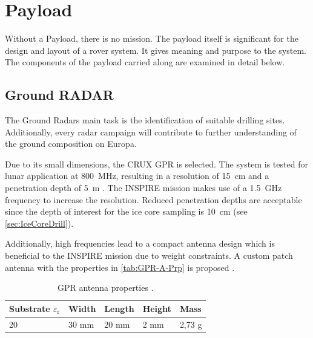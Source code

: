 
\chapter{Payload}
\label{chap:payload}

Without a Payload, there is no mission. The payload itself is significant for the design and layout of a rover system. It gives meaning and purpose to the system. The components of the payload carried along are examined in detail below. 

\section{Ground RADAR}
The Ground Radars main task is the identification of suitable drilling sites. Additionally, every radar campaign will contribute to further understanding of the ground composition on Europa.

Due to its small dimensions, the CRUX GPR is selected. The system is tested for lunar application at 800~MHz, resulting in a resolution of 15~cm and a penetration depth of 5~m \cite{CRUX_GPR}. The INSPIRE mission makes use of a 1.5~GHz frequency to increase the resolution. 
Reduced penetration depths are acceptable since the depth of interest for the ice core sampling is 10~cm (see \autoref{sec:IceCoreDrill}).

Additionally, high frequencies lead to a compact antenna design which is beneficial to the INSPIRE mission due to weight constraints. 
A custom patch antenna with the properties in \autoref{tab:GPR-A-Prp} is proposed \cite{patch_ant_GPR, Patch_Ant_design}.

\begin{table}[h]
\centering
\begin{tabular}{lllll}
\toprule
Substrate ${\varepsilon}_\text{r}$ & Width & Length & Height & Mass   \\
\midrule
20                         & 30 mm & 20 mm  & 2 mm   & 2,73 g  \\
\bottomrule
\end{tabular}
\caption{GPR antenna properties \cite{Patch_Ant_design}.}
\label{tab:GPR-A-Prp}
\end{table}

